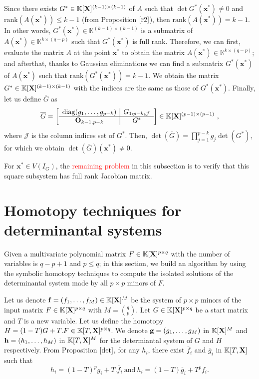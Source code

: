 \documentclass[11pt]{article}
\numberwithin{Property}{section}
\numberwithin{Theorem}{section}
\numberwithin{Proposition}{section}
\numberwithin{Lemma}{section}
\numberwithin{Corollary}{section}
\numberwithin{Definition}{section}
\numberwithin{Remark}{section}
\numberwithin{Conjecture}{section}
\numberwithin{Problem}{section}
\numberwithin{Claim}{section}
\theoremstyle{definition}
\numberwithin{Example}{section}
\renewcommand{\leq}{\leqslant}
\def\bar{\overline}
\newcommand{\field}{\mathbb{K}} %
\newcommand{\mat}[1]{\mathbf{\MakeUppercase{#1}}} %
\newcommand{\todo}[1]{\textcolor{red}{#1}} %
\begin{document}
Since there exists ${G}^* \in \field[\mat{X}]^{(k-1) \times (k-1)}$  of $A$ such that $\det{{G}^*}(\mathbf{x}^*) \ne 0$ and $\mathrm{rank}(A(\mathbf{x}^{*})) \leq k-1$ (from Proposition $\ref{r2}$), then $\mathrm{rank}(A(\mathbf{x}^{*})) = k-1$. In other words, ${G}^*(\mathbf{x}^*) \in \field^{(k-1)\times (k-1)}$ is a submatrix of $A(\mathbf{x}^*) \in \field^{k \times (q-p)}$ such that ${G}^*(\mathbf{x}^*)$ is full rank. Therefore, we can first, evaluate the matrix $A$ at the point $\mathbf{x}^*$ to obtain the matrix $A(\mathbf{x}^*) \in \field^{k \times (q-p)}$; and afterthat, thanks to Gaussian eliminations we can find a submatrix ${G}^*(\mathbf{x}^*)$ of $A(\mathbf{x}^*)$ such that $\mathrm{rank}({G}^*(\mathbf{x}^*)) = k-1$.  We obtain the matrix ${G}^* \in \field[\mat{X}]^{(k-1) \times (k-1)}$ with the indices are the same as those of ${G}^*(\mathbf{x}^*)$. Finally, let us define $\bar{G}$ as 
\[\bar{G} = 
\left[\begin{array}{c |c}%
\mathrm{diag}(g_1, \ldots, g_{p-k}) & G_{1:p-k; \mathcal{J}} \\  \hline
\mat{O}_{k-1,p-k} & G^*\\
\end{array}
\right] \in \field[\mat{X}]^{(p-1) \times (p-1)} \ ,\] where $\mathcal{J}$ is the column indices set of $G^*$. Then, $\det(\bar{G}) = \prod_{j = 1}^{p-k}g_j\det(G^*)$, for which we obtain $\det(\bar{G})(\mathbf{x}^*) \ne 0$.

For $\mathbf{x}^* \in V(I_G)$, the \todo{remaining problem} in this subsection is to verify that this square subsystem has full rank Jacobian matrix. 
\section{Homotopy techniques for determinantal systems} 
Given a multivariate polynomial matrix $F \in \field[\mat{X}]^{p \times q}$ with the number of variables is $q-p+1$ and $p \leq q$; in this section, we build an algorithm by using the symbolic homotopy techniques to compute the isolated solutions of the determinantal system made by all $p \times p$ minors of $F$. 

Let us denote ${\bf{f}} = (f_1, \ldots, f_M) \in \field[{\mat{X}}]^M$ be the system of $p \times p$ minors of the input matrix $F \in \field[\mat{X}]^{p \times q}$ with $M = {{q}\choose{p}}$. Let $G \in \field[\mat{X}]^{p \times q}$ be a start matrix and $T$ is a new variable. Let us define the homotopy $H = (1-T)G + T.F \in \field[T,\mat{X}]^{p \times q}$. We denote ${\bf g} = (g_1, \ldots, g_M)$ in $\field[\mat{X}]^M$ and ${\bf h} = (h_1, \ldots, h_M)$ in $\field[T,\mat{X}]^M$ for the determiantal system of $G$ and $H$ respectively. From Proposition $\ref{det}$, for any $h_i$, there exist $\bar{f}_i$ and $\bar{g}_i$ in $\field[T, \mat{X}]$ such that 
\begin{equation} \label{deteq}
h_i = (1-T)^pg_i + T.\bar{f}_{i} \ \mathrm{and} \ h_i = (1-T)\bar{g}_i + T^pf_i.
\end{equation}
\end{document}
